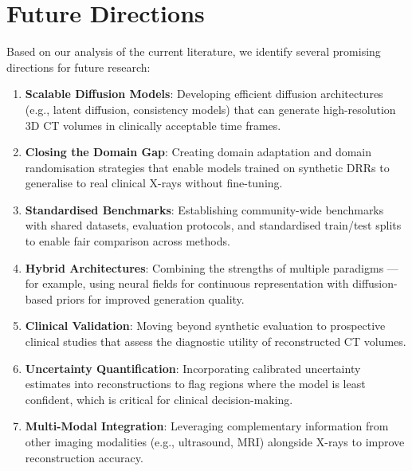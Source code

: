 
\section{Future Directions}
\label{sec:future_directions}

Based on our analysis of the current literature, we identify several promising directions for future research:

\begin{enumerate}
  \item \textbf{Scalable Diffusion Models}: Developing efficient diffusion architectures (e.g., latent diffusion, consistency models) that can generate high-resolution 3D CT volumes in clinically acceptable time frames.

  \item \textbf{Closing the Domain Gap}: Creating domain adaptation and domain randomisation strategies that enable models trained on synthetic DRRs to generalise to real clinical X-rays without fine-tuning.

  \item \textbf{Standardised Benchmarks}: Establishing community-wide benchmarks with shared datasets, evaluation protocols, and standardised train/test splits to enable fair comparison across methods.

  \item \textbf{Hybrid Architectures}: Combining the strengths of multiple paradigms — for example, using neural fields for continuous representation with diffusion-based priors for improved generation quality.

  \item \textbf{Clinical Validation}: Moving beyond synthetic evaluation to prospective clinical studies that assess the diagnostic utility of reconstructed CT volumes.

  \item \textbf{Uncertainty Quantification}: Incorporating calibrated uncertainty estimates into reconstructions to flag regions where the model is least confident, which is critical for clinical decision-making.

  \item \textbf{Multi-Modal Integration}: Leveraging complementary information from other imaging modalities (e.g., ultrasound, MRI) alongside X-rays to improve reconstruction accuracy.
\end{enumerate}


